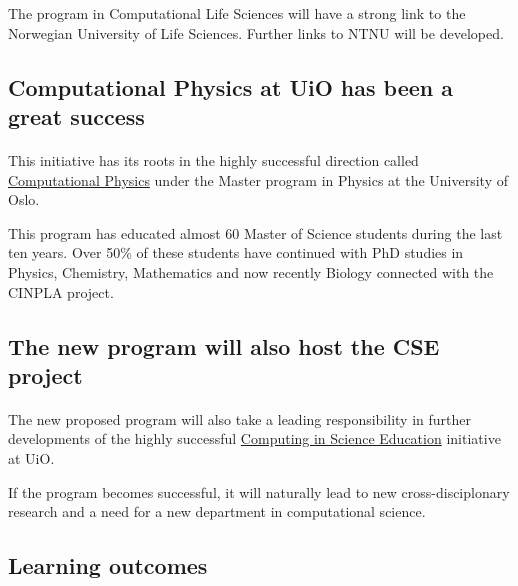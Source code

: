 \documentclass[%
twoside,                 %
final,                   %
10pt]{article}
\begin{document}
The program in Computational Life Sciences will have a strong
link to the Norwegian University of Life Sciences. Further links to
NTNU will be developed.




\subsection*{Computational Physics at UiO has been a great success}

\paragraph{}

This initiative has its roots in the highly successful direction called \href{{http://www.uio.no/english/studies/programmes/physics-master/programme-options/computational/index.html}}{Computational Physics}
under the Master program in Physics at the University of Oslo.

This program has educated almost 60 Master of Science students during
the last ten years.  Over 50\% of these students have continued with
PhD studies in Physics, Chemistry, Mathematics and now recently
Biology connected with the CINPLA project.



\subsection*{The new program will also host the CSE project}

\paragraph{}

The new proposed program will also take a leading responsibility in further
developments of the highly successful \href{{http://www.mn.uio.no/english/about/collaboration/cse/}}{Computing in Science Education} initiative at UiO.

If the program becomes successful, it will naturally lead to
new cross-disciplonary research and a need for a new department
in computational science.




\subsection*{Learning outcomes}
\end{document}
